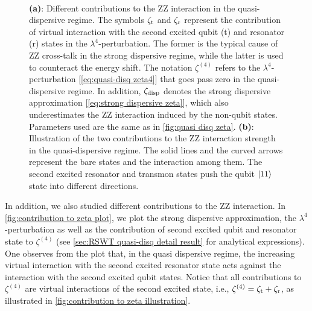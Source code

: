 \documentclass[%
 reprint,
 amsmath,amssymb,
 aps,
pra,
noeprint,
superscriptaddress,
]{revtex4-2}
\begin{document}
\begin{figure}
    \\
    \caption{{\bf (a)}: Different contributions to the ZZ interaction in the quasi-dispersive regime.
    The symbols $\zeta_{\rm{t}}$ and $\zeta_{\rm{r}}$ represent the contribution of virtual interaction with the second excited qubit (t) and resonator (r) states in the $\lambda^4$-perturbation.
    The former is the typical cause of ZZ cross-talk in the strong dispersive regime, while the latter is used to counteract the energy shift.
    The notation $\zeta^{(4)}$ refers to the $\lambda^4$-perturbation [\cref{eq:quasi-disq zeta4}] that goes pass zero in the quasi-dispersive regime.
    In addition, $\zeta_{\textnormal{disp}}$ denotes the strong dispersive approximation [\cref{eq:strong dispersive zeta}], which also underestimates the ZZ interaction induced by the non-qubit states. Parameters used are the same as in \cref{fig:quasi disq zeta}.
    {\bf (b)}: Illustration of the two contributions to the ZZ interaction strength in the quasi-dispersive regime.
    The solid lines and the curved arrows represent the bare states and the interaction among them.
    The second excited resonator and transmon states push the qubit $\ket{11}$ state into different directions.
    }
    \label{fig:contribution to zeta}
\end{figure}



In addition, we also studied different contributions to the ZZ interaction.
In \cref{fig:contribution to zeta plot}, we plot the strong dispersive approximation, the $\lambda^4$-perturbation as well as the contribution of second excited qubit and resonator state to $\zeta^{(4)}$ (see \cref{sec:RSWT quasi-disq detail result} for analytical expressions).
One observes from the plot that, in the quasi dispersive regime, the increasing virtual interaction with the second excited resonator state acts against the interaction with the second excited qubit states.
Notice that all contributions to $\zeta^{(4)}$ are virtual interactions of the second excited state, i.e., $\zeta^{(4)} = \zeta_{\textnormal{t}} + \zeta_{\textnormal{r}}$, as illustrated in \cref{fig:contribution to zeta illustration}.
\end{document}
